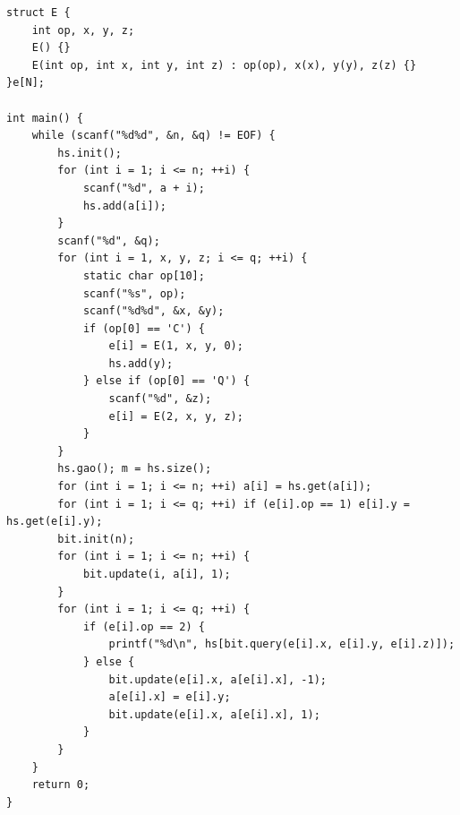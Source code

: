 \begin{lstlisting}
struct E {
    int op, x, y, z;
    E() {}
    E(int op, int x, int y, int z) : op(op), x(x), y(y), z(z) {}
}e[N]; 

int main() {
    while (scanf("%d%d", &n, &q) != EOF) {
        hs.init();
        for (int i = 1; i <= n; ++i) {
            scanf("%d", a + i);
            hs.add(a[i]);
        }
		scanf("%d", &q);
        for (int i = 1, x, y, z; i <= q; ++i) {   
			static char op[10];
			scanf("%s", op);
            scanf("%d%d", &x, &y);
			if (op[0] == 'C') {
				e[i] = E(1, x, y, 0);
				hs.add(y);
			} else if (op[0] == 'Q') {
				scanf("%d", &z);
				e[i] = E(2, x, y, z);
			}
        }
        hs.gao(); m = hs.size();  
        for (int i = 1; i <= n; ++i) a[i] = hs.get(a[i]);
        for (int i = 1; i <= q; ++i) if (e[i].op == 1) e[i].y = hs.get(e[i].y);  
		bit.init(n); 
        for (int i = 1; i <= n; ++i) { 
			bit.update(i, a[i], 1);
        }
        for (int i = 1; i <= q; ++i) { 
            if (e[i].op == 2) {
				printf("%d\n", hs[bit.query(e[i].x, e[i].y, e[i].z)]);
            } else {
				bit.update(e[i].x, a[e[i].x], -1);
				a[e[i].x] = e[i].y;
				bit.update(e[i].x, a[e[i].x], 1);
            }
        }
    }
    return 0;
}
\end{lstlisting}

